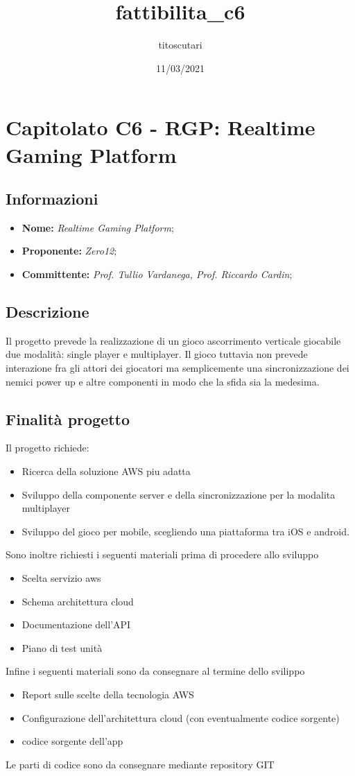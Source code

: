 \documentclass{article}
\title{fattibilita_c6}
\author{titoscutari}
\date{11/03/2021}
\begin{document}
\section{Capitolato C6 - RGP: Realtime Gaming Platform}
\subsection{Informazioni}
\begin{itemize}
    \item \textbf{Nome:} \textit{Realtime Gaming Platform}; 
    \item \textbf{Proponente:} \textit{Zero12};
    \item \textbf{Committente:} \textit{Prof. Tullio Vardanega, Prof. Riccardo Cardin};
\end{itemize}
\subsection{Descrizione}
Il progetto prevede la realizzazione di un gioco ascorrimento verticale giocabile due modalit\`a: single player e multiplayer. Il gioco tuttavia non prevede interazione fra gli attori dei giocatori ma semplicemente una sincronizzazione dei nemici power up e altre componenti in modo che la sfida sia la medesima.
\subsection{Finalit\`a progetto}
Il progetto richiede:
\begin{itemize}
    \item Ricerca della soluzione AWS piu adatta
    \item Sviluppo della componente server e della sincronizzazione per la modalita multiplayer
    \item Sviluppo del gioco per mobile, scegliendo una piattaforma tra iOS e android.
\end{itemize}
Sono inoltre richiesti i seguenti materiali prima di procedere allo sviluppo
\begin{itemize}
    \item Scelta servizio aws
    \item Schema architettura cloud
    \item Documentazione dell'API
    \item Piano di test unit\`a
\end{itemize}
Infine i seguenti materiali sono da consegnare al termine dello svilippo
\begin{itemize}
    \item Report sulle scelte della tecnologia AWS
    \item Configurazione dell'architettura cloud (con eventualmente codice sorgente)
    \item codice sorgente dell'app
\end{itemize}
Le parti di codice sono da consegnare mediante repository GIT
\end{document}
